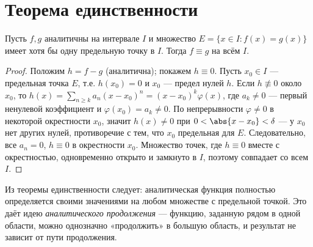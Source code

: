 \section{Теорема единственности}

\begin{theorem}
Пусть $f,g$ аналитичны на интервале $I$ и множество $E=\{x\in I: f(x)=g(x)\}$ имеет хотя бы одну
предельную точку в $I$. Тогда $f\equiv g$ на всём $I$.
\end{theorem}

\begin{proof}
Положим $h=f-g$ (аналитична); покажем $h\equiv0$. Пусть $x_0\in I$ — предельная точка $E$, т.е.
$h(x_0)=0$ и $x_0$ — предел нулей $h$. Если $h\not\equiv0$ около $x_0$, то
$h(x)=\sum_{n\ge k}a_n(x-x_0)^n=(x-x_0)^k\varphi(x)$, где $a_k\ne0$ — первый ненулевой
коэффициент и $\varphi(x_0)=a_k\ne0$. По непрерывности $\varphi\ne0$ в некоторой окрестности
$x_0$, значит $h(x)\ne0$ при $0<\abs{x-x_0}<\delta$ — у $x_0$ нет других нулей, противоречие с
тем, что $x_0$ предельная для $E$. Следовательно, все $a_n=0$, $h\equiv0$ в окрестности $x_0$.
Множество точек, где $h\equiv0$ вместе с окрестностью, одновременно открыто и замкнуто в $I$,
поэтому совпадает со всем $I$.
\end{proof}

\begin{remark}
Из теоремы единственности следует: аналитическая функция полностью определяется своими значениями
на любом множестве с предельной точкой. Это даёт идею \emph{аналитического продолжения} — функцию,
заданную рядом в одной области, можно однозначно «продолжить» в большую область, и результат не
зависит от пути продолжения.
\end{remark}
